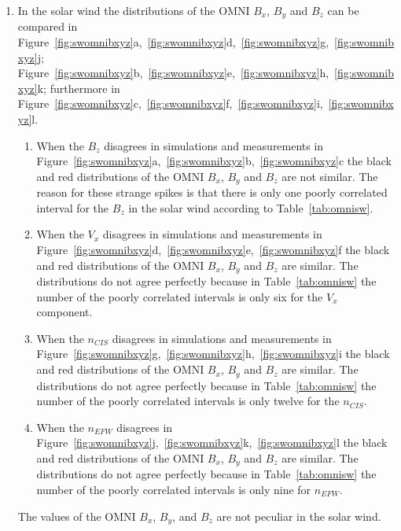 \documentclass[draft]{agujournal2019}
\begin{document}
\begin{enumerate}
\item In the solar wind the distributions of the OMNI $B_{x}$, $B_{y}$ and $B_{z}$ can be compared in Figure~\ref{fig:swomnibxyz}a,~\ref{fig:swomnibxyz}d,~\ref{fig:swomnibxyz}g,~\ref{fig:swomnibxyz}j; Figure~\ref{fig:swomnibxyz}b,~\ref{fig:swomnibxyz}e,~\ref{fig:swomnibxyz}h,~\ref{fig:swomnibxyz}k; furthermore in Figure~\ref{fig:swomnibxyz}c,~\ref{fig:swomnibxyz}f,~\ref{fig:swomnibxyz}i,~\ref{fig:swomnibxyz}l.
\begin{enumerate}
\item When the $B_{z}$ disagrees in simulations and measurements in Figure~\ref{fig:swomnibxyz}a,~\ref{fig:swomnibxyz}b,~\ref{fig:swomnibxyz}c the black and red distributions of the OMNI $B_{x}$, $B_{y}$ and $B_{z}$ are not similar. The reason for these strange spikes is that there is only one poorly correlated interval for the $B_{z}$ in the solar wind according to Table~\ref{tab:omnisw}.

\item When the $V_{x}$ disagrees in simulations and measurements in Figure~\ref{fig:swomnibxyz}d,~\ref{fig:swomnibxyz}e,~\ref{fig:swomnibxyz}f the black and red distributions of the OMNI $B_{x}$, $B_{y}$ and $B_{z}$ are similar. The distributions do not agree perfectly because in Table~\ref{tab:omnisw} the number of the poorly correlated intervals is only six for the $V_{x}$ component.

\item When the $n_{CIS}$ disagrees in simulations and measurements in Figure~\ref{fig:swomnibxyz}g,~\ref{fig:swomnibxyz}h,~\ref{fig:swomnibxyz}i the black and red distributions of the OMNI $B_{x}$, $B_{y}$ and $B_{z}$ are similar. The distributions do not agree perfectly because in Table~\ref{tab:omnisw} the number of the poorly correlated intervals is only twelve for the $n_{CIS}$.
 
\item When the $n_{EFW}$ disagrees in Figure~\ref{fig:swomnibxyz}j,~\ref{fig:swomnibxyz}k,~\ref{fig:swomnibxyz}l the black and red distributions of the OMNI $B_{x}$, $B_{y}$ and $B_{z}$ are similar. The distributions do not agree perfectly because in Table~\ref{tab:omnisw} the number of the poorly correlated intervals is only nine for $n_{EFW}$.
\end{enumerate}
The values of the OMNI $B_{x}$, $B_{y}$, and $B_{z}$ are not peculiar in the solar wind.


\end{enumerate}
\end{document}
